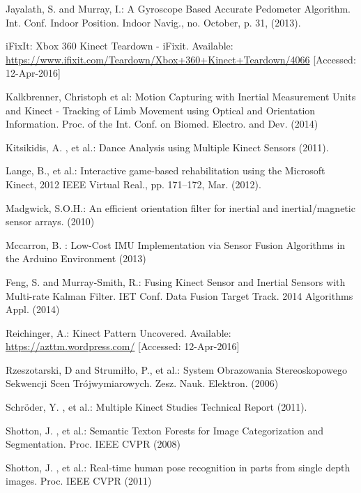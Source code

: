 \documentclass{llncs}
\begin{document}
\begin{thebibliography}{5}
	Jayalath, S. and  Murray, I.: 
	A Gyroscope Based Accurate Pedometer Algorithm.
	Int. Conf. Indoor Position. Indoor Navig., no. October, p. 31, (2013).
			
	iFixIt:
	Xbox 360 Kinect Teardown - iFixit.
	Available: \url{https://www.ifixit.com/Teardown/Xbox+360+Kinect+Teardown/4066} [Accessed: 12-Apr-2016]
	
	Kalkbrenner, Christoph et al:
	Motion Capturing with Inertial Measurement Units and Kinect - Tracking of Limb Movement using Optical and Orientation Information.
	Proc. of the Int. Conf. on Biomed. Electro. and Dev. (2014)
				
	Kitsikidis, A. , et al.:
	Dance Analysis using Multiple Kinect Sensors (2011).
	
	Lange, B., et al.: 
	Interactive game-based rehabilitation using the Microsoft Kinect,
	2012 IEEE Virtual Real., pp. 171–172, Mar. (2012).
	
	Madgwick, S.O.H.:
	An efficient orientation filter for inertial and inertial/magnetic sensor arrays. (2010)
		
	Mccarron, B. :
	Low-Cost IMU Implementation via Sensor Fusion Algorithms in the Arduino Environment (2013)
				
	Feng, S. and Murray-Smith, R.: Fusing Kinect Sensor and Inertial Sensors with Multi-rate Kalman Filter.
	IET Conf. Data Fusion Target Track. 2014 Algorithms Appl. (2014)
	
	Reichinger, A.:
	Kinect Pattern Uncovered.
	Available: \url{https://azttm.wordpress.com/} [Accessed: 12-Apr-2016]
				
	Rzeszotarski, D and Strumi{\l}{\l}o, P., et al.:
	System Obrazowania Stereoskopowego Sekwencji Scen Tr{\'{o}}jwymiarowych.
	Zesz. Nauk. Elektron. (2006)
	
	Schr{\"{o}}der, Y. , et al.:
	Multiple Kinect Studies Technical Report (2011).
			
	Shotton, J. , et al.:
	Semantic Texton Forests for Image Categorization and Segmentation.		
	Proc. IEEE CVPR (2008)		
			
	Shotton, J. , et al.:
	Real-time human pose recognition in parts from single depth images.		
	Proc. IEEE CVPR (2011)	
					

\end{thebibliography}
\end{document}
